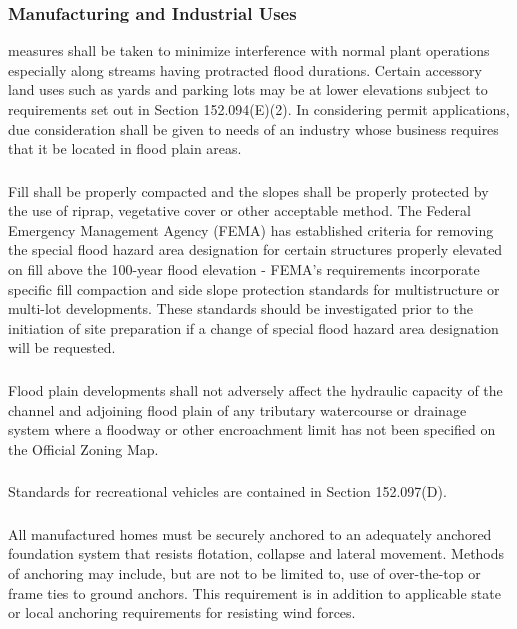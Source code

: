 \subsubsection{Manufacturing and Industrial Uses}
measures shall be taken to minimize interference with normal plant operations especially along streams having protracted flood durations. Certain accessory land uses such as yards and parking lots may be at lower elevations subject to requirements set out in Section 152.094(E)(2). In considering permit applications, due consideration shall be given to needs of an industry whose business requires that it be located in flood plain areas.
\subsubsection{}
Fill shall be properly compacted and the slopes shall be properly protected by the use of riprap, vegetative cover or other acceptable method. The Federal Emergency Management Agency (FEMA) has established criteria for removing the special flood hazard area designation for certain structures properly elevated on fill above the 100-year flood elevation - FEMA's requirements incorporate specific fill compaction and side slope protection standards for multistructure or multi-lot developments. These standards should be investigated prior to the initiation of site preparation if a change of special flood hazard area designation will be requested.
\subsubsection{}
Flood plain developments shall not adversely affect the hydraulic capacity of the channel and adjoining flood plain of any tributary watercourse or drainage system where a floodway or other encroachment limit has not been specified on the Official Zoning Map.
\subsubsection{}
Standards for recreational vehicles are contained in Section 152.097(D).
\subsubsection{}
All manufactured homes must be securely anchored to an adequately anchored foundation system that resists flotation, collapse and lateral movement. Methods of anchoring may include, but are not to be limited to, use of over-the-top or frame ties to ground anchors. This requirement is in addition to applicable state or local anchoring requirements for resisting wind forces.

